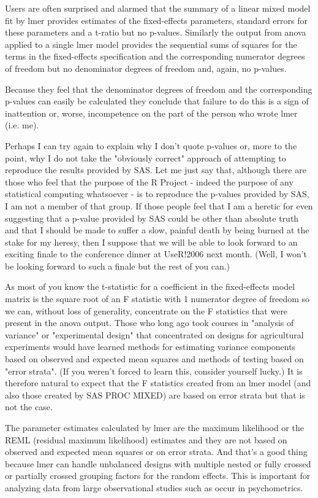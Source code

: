 Users are often surprised and alarmed that the summary of a linear
mixed model fit by lmer provides estimates of the fixed-effects
parameters, standard errors for these parameters and a t-ratio but no
p-values.  Similarly the output from anova applied to a single lmer
model provides the sequential sums of squares for the terms in the
fixed-effects specification and the corresponding numerator degrees of
freedom but no denominator degrees of freedom and, again, no p-values.

Because they feel that the denominator degrees of freedom and the
corresponding p-values can easily be calculated they conclude that
failure to do this is a sign of inattention or, worse, incompetence on
the part of the person who wrote lmer (i.e. me).

Perhaps I can try again to explain why I don't quote p-values or, more
to the point, why I do not take the "obviously correct" approach of
attempting to reproduce the results provided by SAS.  Let me just say
that, although there are those who feel that the purpose of the R
Project - indeed the purpose of any statistical computing whatsoever -
is to reproduce the p-values provided by SAS, I am not a member of
that group.  If those people feel that I am a heretic for even
suggesting that a p-value provided by SAS could be other than absolute
truth and that I should be made to suffer a slow, painful death by
being burned at the stake for my heresy, then I suppose that we will
be able to look forward to an exciting finale to the conference dinner
at UseR!2006 next month. (Well, I won't be looking forward to such a
finale but the rest of you can.)

As most of you know the t-statistic for a coefficient in the
fixed-effects model matrix is the square root of an F statistic with 1
numerator degree of freedom so we can, without loss of generality,
concentrate on the F statistics that were present in the anova output.
 Those who long ago took courses in "analysis of variance" or
"experimental design" that concentrated on designs for agricultural
experiments would have learned methods for estimating variance
components based on observed and expected mean squares and methods of
testing based on "error strata".  (If you weren't forced to learn
this, consider yourself lucky.)  It is therefore natural to expect
that the F statistics created from an lmer model (and also those
created by SAS PROC MIXED) are based on error strata but that is not
the case.

The parameter estimates calculated by lmer are the maximum likelihood
or the REML (residual maximum likelihood) estimates and they are not
based on observed and expected mean squares or on error strata.  And
that's a good thing because lmer can handle unbalanced designs with
multiple nested or fully crossed or partially crossed grouping factors
for the random effects.  This is important for analyzing data from
large observational studies such as occur in psychometrics.

